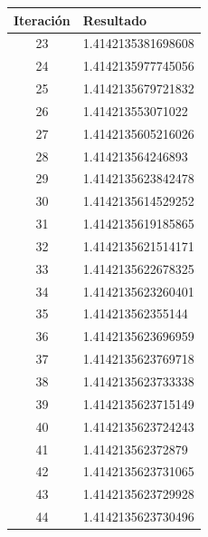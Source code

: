\documentclass[titlepage,a4paper]{article}
\begin{document}
\begin{multicols}{2}
\begin{center}
\begin{tabular}{| c | l |}
\hline   
 Iteración & Resultado \\ \hline
23     &  1.4142135381698608 \\
24     &  1.4142135977745056 \\
25     &  1.4142135679721832 \\
26     &  1.414213553071022 \\
27     &  1.4142135605216026 \\
28     &  1.414213564246893 \\
29     &  1.4142135623842478 \\
30     &  1.4142135614529252 \\
31     &  1.4142135619185865 \\
32     &  1.4142135621514171 \\
33     &  1.4142135622678325 \\
34     &  1.4142135623260401 \\
35     &  1.414213562355144 \\
36     &  1.4142135623696959 \\
37     &  1.4142135623769718 \\
38     &  1.4142135623733338 \\
39     &  1.4142135623715149 \\
40     &  1.4142135623724243 \\
41     &  1.414213562372879 \\
42     &  1.4142135623731065 \\
43     &  1.4142135623729928 \\
44     &  1.4142135623730496 \\
        \hline
    \end{tabular}
\end{center}
\clearpage
\end{multicols}
\end{document}
